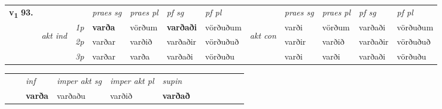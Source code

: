 \begin{tabular}{llllllllllll} \toprule
\multirow{4}{*}{{{\textbf{v{\textsubscript{1}}} \Large{\textbf{93.}}}}}  & &   &  \textit{praes sg}  & \textit{praes pl}  &\textit{ pf sg} & \textit{pf pl} &  &  \textit{praes sg}  & \textit{praes pl}  & \textit{pf sg} & \textit{pf pl } \\*
	\cmidrule{4-7} \cmidrule{9-12}
 & \multirow{3}{*}{\begin{turn}{90}\textit{akt ind}\end{turn}} & {\textit{1p}} & \textbf{varða} & vörðum    & \textbf{varðaði} & vörðuðum & \multirow{3}{*}{\begin{turn}{90}\textit{akt con}\end{turn}} &varði & vörðum & varðaði & vörðuðum\\*
& &  {\textit{2p}} &  varðar  & varðið   & varðaðir & vörðuðuð & & varðir & varðið & varðaðir & vörðuðuð \\*
& &  {\textit{3p}} & varðar & varða   & varðaði & vörðuðu & & varði & varði& varðaði & vörðuðu  \\*
\cmidrule{4-7} \cmidrule{9-12}
\end{tabular}


\begin{tabular}{llllllllllll}
 & & \textit{inf} & \textit{imper akt sg} & \textit{imper akt pl}    & \textit{supin}       \\*
  & & \textbf{varða} & varðaðu  & varðið    &  \textbf{varðað}   \\*
\cmidrule{1-12}
\end{tabular}



